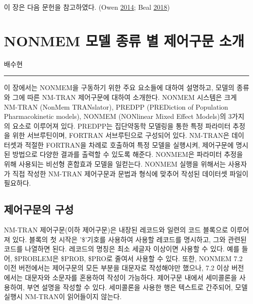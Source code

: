 \documentclass[
  10pt,
  krantz2,
  a4paper]{krantz}
\theoremstyle{definition}
\theoremstyle{definition}
\theoremstyle{definition}
\theoremstyle{remark}
\begin{document}
이 장은 다음 문헌을 참고하였다. (Owen \protect\hyperlink{ref-kelly}{2014}; Beal \protect\hyperlink{ref-nonmem}{2018})

\hypertarget{control-stream}{%
\chapter{NONMEM 모델 종류 별 제어구문 소개}\label{control-stream}}

배수현

\begin{center}\rule{0.5\linewidth}{0.5pt}\end{center}

이 장에서는 NONMEM을 구동하기 위한 주요 요소들에 대하여 설명하고, 모델의 종류와 그에 따른 NM-TRAN 제어구문에 대하여 소개한다. NONMEM 시스템은 크게 NM-TRAN (NonMem TRANslator), PREDPP (PREDiction of Population Pharmacokinetic models), NONMEM (NONlinear Mixed Effect Models)의 3가지의 요소로 이루어져 있다. PREDPP는 집단약동학 모델링을 통한 특정 파라미터 추정을 위한 서브루틴이며, FORTRAN 서브루틴으로 구성되어 있다. NM-TRAN은 데이터셋과 적절한 FORTRAN을 차례로 호출하여 특정 모델을 실행시켜, 제어구문에 명시된 방법으로 다양한 결과를 출력할 수 있도록 해준다. NONMEM은 파라미터 추정을 위해 사용되는 비선형 혼합효과 모델을 일컫는다. NONMEM 실행을 위해서는 사용자가 직접 작성한 NM-TRAN 제어구문과 문법과 형식에 맞추어 작성된 데이터셋 파일이 필요하다.

\hypertarget{uxc81cuxc5b4uxad6cuxbb38uxc758-uxad6cuxc131}{%
\section{제어구문의 구성}\label{uxc81cuxc5b4uxad6cuxbb38uxc758-uxad6cuxc131}}

NM-TRAN 제어구문(이하 제어구문)은 내장된 레코드와 일련의 코드 블록으로 이루어져 있다. 블록의 첫 시작은 '\$'기호를 사용하여 사용할 레코드를 명시하고, 그와 관련된 코드를 나열하면 된다. 레코드의 명칭은 최소 세글자 이상이면 사용할 수 있다. 예를 들어, \$PROBLEM은 \$PROB, \$PRO로 줄여서 사용할 수 있다. 또한, NONMEM 7.2 이전 버전에서는 제어구문의 모든 부분을 대문자로 작성해야만 했으나, 7.2 이상 버전에서는 대문자와 소문자를 혼용하여 작성이 가능하다. 제어구문 내에서 세미콜론을 사용하여, 부연 설명을 작성할 수 있다. 세미콜론을 사용한 행은 텍스트로 간주되어, 모델 실행시 NM-TRAN이 읽어들이지 않는다.
\end{document}
